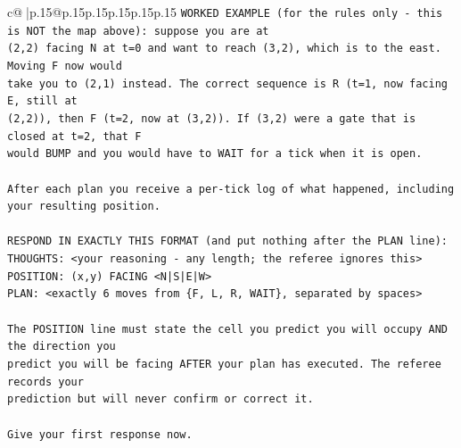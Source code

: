 \documentclass{article}
\begin{document}
{\begin{supertabular}{c@{$\;$}|p{.15\linewidth}@{}p{.15\linewidth}p{.15\linewidth}p{.15\linewidth}p{.15\linewidth}p{.15\linewidth}}
{{{\texttt{WORKED EXAMPLE (for the rules only {-} this is NOT the map above): suppose you are at} \\
\texttt{(2,2) facing N at t=0 and want to reach (3,2), which is to the east. Moving F now would} \\
\texttt{take you to (2,1) instead. The correct sequence is R (t=1, now facing E, still at} \\
\texttt{(2,2)), then F (t=2, now at (3,2)). If (3,2) were a gate that is closed at t=2, that F} \\
\texttt{would BUMP and you would have to WAIT for a tick when it is open.} \\
\\ 
\texttt{After each plan you receive a per{-}tick log of what happened, including your resulting position.} \\
\\ 
\texttt{RESPOND IN EXACTLY THIS FORMAT (and put nothing after the PLAN line):} \\
\texttt{THOUGHTS: <your reasoning {-} any length; the referee ignores this>} \\
\texttt{POSITION: (x,y) FACING <N|S|E|W>} \\
\texttt{PLAN: <exactly 6 moves from \{F, L, R, WAIT\}, separated by spaces>} \\
\\ 
\texttt{The POSITION line must state the cell you predict you will occupy AND the direction you} \\
\texttt{predict you will be facing AFTER your plan has executed. The referee records your} \\
\texttt{prediction but will never confirm or correct it.} \\
\\ 
\texttt{Give your first response now.} \\
            }
        }
    }
     \\ \\


\end{supertabular}}
\end{document}
